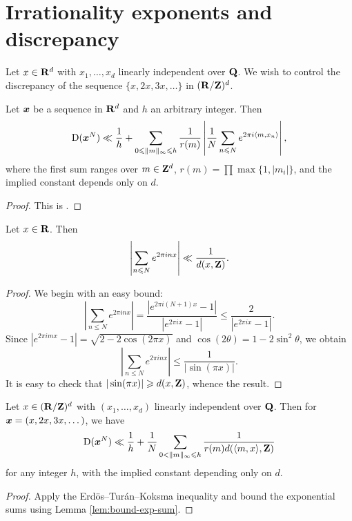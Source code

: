 \section{Irrationality exponents and discrepancy}

Let $x\in \mathbf{R}^d$ with $x_1,\dots,x_d$ linearly independent over $\mathbf{Q}$. We wish 
to control the discrepancy of the sequence $\{x,2x,3x,\dots\}$ in 
$(\mathbf{R}/\mathbf{Z})^d$. 

\begin{theorem}
Let ${\boldsymbol x}$ be a sequence in $\mathbf{R}^d$ and $h$ an arbitrary integer. Then 
\[
	\operatorname{D}({\boldsymbol x}^N) \ll \frac 1 h + \sum_{0\leqslant \|m\|_\infty \leqslant h} \frac{1}{r(m)} \left| \frac 1 N \sum_{n\leqslant N} e^{2\pi i \langle m,x_n\rangle}\right| ,
\]
where the first sum ranges over $m\in \mathbf{Z}^d$, 
$r(m) = \prod \max\{1,|m_i|\}$, and the implied constant depends only on $d$. 
\end{theorem}
\begin{proof}
This is \cite[Th.~1.21]{drmota-tichy-1997}. 
\end{proof}

\begin{lemma}\label{lem:bound-exp-sum}
Let $x\in \mathbf{R}$. Then 
\[
	\left| \sum_{n\leqslant N} e^{2\pi i n x}\right| \ll \frac{1}{d(x, \mathbf{Z})} .
\]
\end{lemma}
\begin{proof}
We begin with an easy bound: 
\[
	\left| \sum_{n\leqslant N} e^{2\pi i n x}\right| = \frac{|e^{2\pi i (N+1) x} - 1|}{|e^{2\pi i x} - 1|} \leqslant \frac{2}{|e^{2\pi i x} - 1|} .
\]
Since $|e^{2\pi i m x} - 1| = \sqrt{2-2\cos(2\pi x)}$ and 
$\cos(2\theta) = 1-2\sin^2\theta$, we obtain 
\[
	\left|\sum_{n\leqslant N} e^{2\pi i n x}\right| \leqslant \frac{1}{|\sin(\pi x)|} .
\]
It is easy to check that $|\sin(\pi x)| \geqslant d(x,\mathbf{Z})$, whence the result.  
\end{proof}

\begin{corollary}\label{cor:bound-disc-distance}
Let $x\in (\mathbf{R}/\mathbf{Z})^d$ with $(x_1,\dots,x_d)$ linearly independent over $\mathbf{Q}$. 
Then for ${\boldsymbol x}=(x,2x,3x,\dots)$, we have 
\[
	\operatorname{D}({\boldsymbol x}^N) \ll \frac 1 h + \frac 1 N \sum_{0<\|m\|_\infty \leqslant h} \frac{1}{r(m) d(\langle m,x\rangle,\mathbf{Z})} 
\]
for any integer $h$, with the implied constant depending only on $d$. 
\end{corollary}
\begin{proof}
Apply the Erd\"os--Tur\'an--Koksma inequality and bound the exponential sums 
using Lemma \ref{lem:bound-exp-sum}. 
\end{proof}

